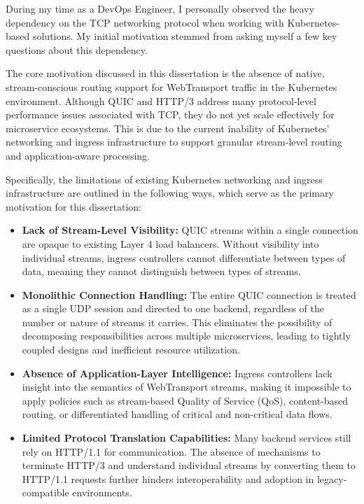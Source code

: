 During my time as a DevOps Engineer, I personally observed the heavy dependency on the TCP networking protocol when working with Kubernetes-based solutions. My initial motivation stemmed from asking myself a few key questions about this dependency.

The core motivation discussed in this dissertation is the absence of native, stream-conscious routing support for WebTransport traffic in the Kubernetes environment. Although QUIC and HTTP/3 address many protocol-level performance issues associated with TCP, they do not yet scale effectively for microservice ecosystems. This is due to the current inability of Kubernetes’ networking and ingress infrastructure to support granular stream-level routing and application-aware processing.

Specifically, the limitations of existing Kubernetes networking and ingress infrastructure are outlined in the following ways, which serve as the primary motivation for this dissertation:

\begin{itemize}
\item \textbf{Lack of Stream-Level Visibility:} QUIC streams within a single connection are opaque to existing Layer 4 load balancers. Without visibility into individual streams, ingress controllers cannot differentiate between types of data, meaning they cannot distinguish between types of streams.

\item \textbf{Monolithic Connection Handling:} The entire QUIC connection is treated as a single UDP session and directed to one backend, regardless of the number or nature of streams it carries. This eliminates the possibility of decomposing responsibilities across multiple microservices, leading to tightly coupled designs and inefficient resource utilization.

\item \textbf{Absence of Application-Layer Intelligence:} Ingress controllers lack insight into the semantics of WebTransport streams, making it impossible to apply policies such as stream-based Quality of Service (QoS), content-based routing, or differentiated handling of critical and non-critical data flows.

\item \textbf{Limited Protocol Translation Capabilities:} Many backend services still rely on HTTP/1.1 for communication. The absence of mechanisms to terminate HTTP/3 and understand individual streams by converting them to HTTP/1.1 requests further hinders interoperability and adoption in legacy-compatible environments.


\end{itemize}

